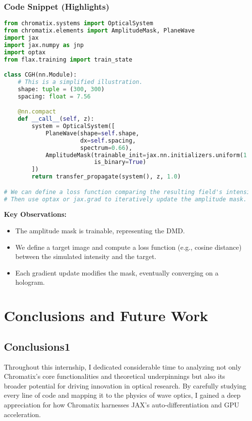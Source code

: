 \documentclass[a4paper,12pt]{report}
\begin{document}
\subsection{Code Snippet (Highlights)}
\begin{lstlisting}[language=Python]
from chromatix.systems import OpticalSystem
from chromatix.elements import AmplitudeMask, PlaneWave
import jax
import jax.numpy as jnp
import optax
from flax.training import train_state

class CGH(nn.Module):
    # This is a simplified illustration.
    shape: tuple = (300, 300)
    spacing: float = 7.56

    @nn.compact
    def __call__(self, z):
        system = OpticalSystem([
            PlaneWave(shape=self.shape,
                      dx=self.spacing,
                      spectrum=0.66),
            AmplitudeMask(trainable_init=jax.nn.initializers.uniform(1.5),
                          is_binary=True)
        ])
        return transfer_propagate(system(), z, 1.0)

# We can define a loss function comparing the resulting field's intensity to a target image.
# Then use optax or jax.grad to iteratively update the amplitude mask.
\end{lstlisting}
\noindent \textbf{Key Observations:}
\begin{itemize}
    \item The amplitude mask is trainable, representing the DMD.
    \item We define a target image and compute a loss function (e.g., cosine distance) between the simulated intensity and the target.
    \item Each gradient update modifies the mask, eventually converging on a hologram.
\end{itemize}

\chapter{Conclusions and Future Work}

\section{Conclusions1}
Throughout this internship, I dedicated considerable time to analyzing not only Chromatix’s core functionalities and theoretical underpinnings but also its broader potential for driving innovation in optical research. By carefully studying every line of code and mapping it to the physics of wave optics, I gained a deep appreciation for how Chromatix harnesses JAX’s auto-differentiation and GPU acceleration.
\end{document}
